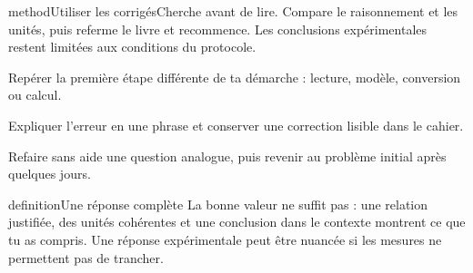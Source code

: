 \documentclass[11pt,twoside,openany]{book}
\begin{document}
\clearpage\pagestyle{otMain}


















\label{corriges-debut}
\begin{pcEncadre}{method}{Utiliser les corrigés}Cherche avant de lire. Compare le raisonnement et les unités, puis referme le livre et recommence. Les conclusions expérimentales restent limitées aux conditions du protocole.\end{pcEncadre}
\begin{questions}
\item Repérer la première étape différente de ta démarche : lecture, modèle, conversion ou calcul.
\item Expliquer l’erreur en une phrase et conserver une correction lisible dans le cahier.
\item Refaire sans aide une question analogue, puis revenir au problème initial après quelques jours.
\end{questions}
\begin{pcEncadre}{definition}{Une réponse complète}
La bonne valeur ne suffit pas : une relation justifiée, des unités cohérentes et une conclusion dans le contexte montrent ce que tu as compris. Une réponse expérimentale peut être nuancée si les mesures ne permettent pas de trancher.
\end{pcEncadre}



















\end{document}
